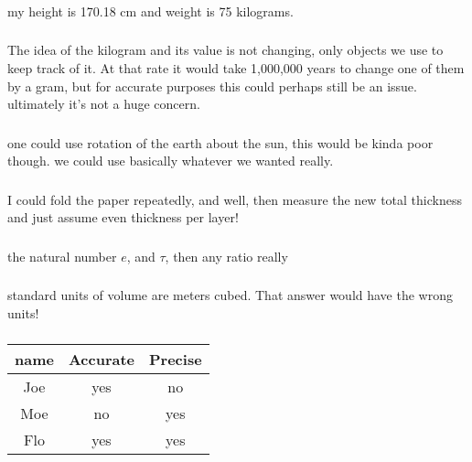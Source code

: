 \documentclass[%
 reprint,
superscriptaddress,
 amsmath,amssymb,
 aps,
prc,
]{revtex4-1}
\begin{document}
\subsubsection{}
my height is 170.18 cm and weight is 75 kilograms.

\subsubsection{}
The idea of the kilogram and its value is not changing, only objects we use to keep track of it. At that rate it would take 1,000,000 years to change one 
of them by a gram, but for accurate purposes this could perhaps still be an issue. ultimately it's not a huge concern.

\subsubsection{}
one could use rotation of the earth about the sun, this would be kinda poor though. we could use basically whatever we wanted really.

\subsubsection{}
I could fold the paper repeatedly, and well, then measure the new total thickness and just assume even thickness per layer!

\subsubsection{}
the natural number $e$, and $\tau$, then any ratio really

\subsubsection{}
standard units of volume are meters cubed. That answer would have the wrong units!

\subsubsection{}
\begin{tabular}{|c|c|c|}
\hline
name & Accurate & Precise\\
\hline
Joe & yes & no\\
Moe & no & yes\\
Flo & yes & yes\\
\hline
\end{tabular}
\end{document}
